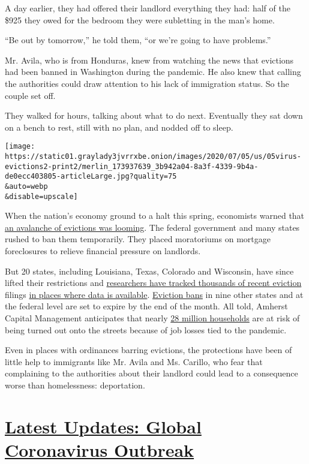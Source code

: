 A day earlier, they had offered their landlord everything they had: half
of the \$925 they owed for the bedroom they were subletting in the man's
home.

``Be out by tomorrow,'' he told them, ``or we're going to have
problems.''

Mr. Avila, who is from Honduras, knew from watching the news that
evictions had been banned in Washington during the pandemic. He also
knew that calling the authorities could draw attention to his lack of
immigration status. So the couple set off.

They walked for hours, talking about what to do next. Eventually they
sat down on a bench to rest, still with no plan, and nodded off to
sleep.

\texttt{[image: https://static01.graylady3jvrrxbe.onion/images/2020/07/05/us/05virus-evictions2-print2/merlin\_173937639\_3b942a04-8a3f-4339-9b4a-de0ecc403805-articleLarge.jpg?quality=75\\\&auto=webp\\\&disable=upscale]}

When the nation's economy ground to a halt this spring, economists
warned that
\href{https://www.nytimes3xbfgragh.onion/2020/05/27/us/coronavirus-evictions-renters.html}{an
avalanche of evictions was looming}. The federal government and many
states rushed to ban them temporarily. They placed moratoriums on
mortgage foreclosures to relieve financial pressure on landlords.

But 20 states, including Louisiana, Texas, Colorado and Wisconsin, have
since lifted their restrictions and
\href{https://evictionlab.org/eviction-tracking/}{researchers have
tracked thousands of recent eviction} filings
\href{https://openjusticeok.shinyapps.io/ok-court-tracker/\#section-tool-by-open-justice-oklahoma}{in
places where data is available}.
\href{https://evictionlab.org/covid-policy-scorecard/}{Eviction bans} in
nine other states and at the federal level are set to expire by the end
of the month. All told, Amherst Capital Management anticipates that
nearly
\href{https://www.multihousingnews.com/post/housing-relief-skips-three-fifth-of-u-s-households/}{28
million households} are at risk of being turned out onto the streets
because of job losses tied to the pandemic.

Even in places with ordinances barring evictions, the protections have
been of little help to immigrants like Mr. Avila and Ms. Carillo, who
fear that complaining to the authorities about their landlord could lead
to a consequence worse than homelessness: deportation.

\hypertarget{latest-updates-global-coronavirus-outbreak}{%
\section{\texorpdfstring{\href{https://www.nytimes3xbfgragh.onion/2020/08/04/world/coronavirus-cases.html?action=click\&pgtype=Article\&state=default\&region=MAIN_CONTENT_1\&context=storylines_live_updates}{Latest
Updates: Global Coronavirus
Outbreak}}{Latest Updates: Global Coronavirus Outbreak}}\label{latest-updates-global-coronavirus-outbreak}}

